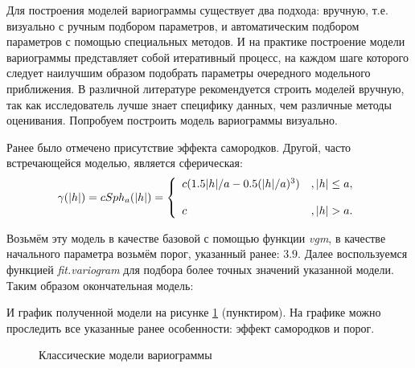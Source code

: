 Для построения моделей вариограммы существует два подхода: вручную, т.е. визуально с ручным подбором параметров, и автоматическим подбором параметров с помощью специальных методов. И на практике построение модели вариограммы представляет собой итеративный процесс, на каждом шаге которого следует наилучшим образом подобрать параметры очередного модельного приближения. В различной литературе рекомендуется строить моделей вручную, так как исследователь лучше знает специфику данных, чем различные методы оценивания. Попробуем построить модель вариограммы визуально.


Ранее было отмечено присутствие эффекта самородков. Другой, часто встречающейся моделью, является сферическая:
\begin{equation}
	\gamma(\vert h \vert) = c Sph_a(\vert h \vert) = \left\{
 \begin{array}{l l}
   c(1.5 \vert h \vert / a - 0.5(\vert h \vert / a)^3) &, \vert h \vert \le a, \\
   \\
   c &,	 \vert h \vert > a.
 \end{array} \right.
\end{equation}

Возьмём эту модель в качестве базовой с помощью функции \textit{vgm}, в качестве начального параметра возьмём порог, указанный ранее: $3.9$. Далее воспользуемся функцией \textit{fit.variogram} для подбора более точных значений указанной модели. Таким образом окончательная модель:

И график полученной модели на рисунке \ref{img:var-models} (пунктиром). На графике можно проследить все указанные ранее особенности: эффект самородков и порог.
\begin{figure}[ht]
\caption{Классические модели вариограммы}
\label{img:var-models}
\end{figure}

